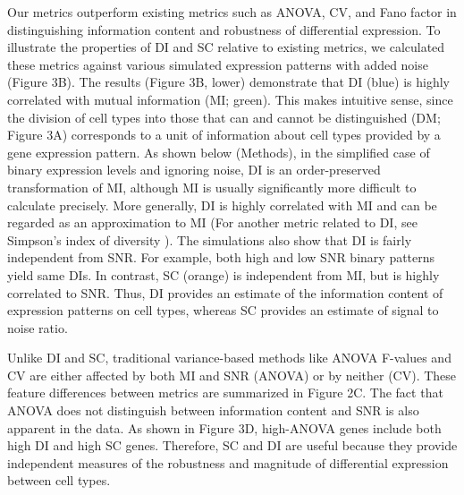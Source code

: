 Our metrics outperform existing metrics such as ANOVA, CV, and Fano factor in distinguishing information content and robustness of differential expression. To illustrate the properties of DI and SC relative to existing metrics, we calculated these metrics against various simulated expression patterns with added noise (Figure 3B). The results (Figure 3B, lower) demonstrate that DI (blue) is highly correlated with mutual information (MI; green). This makes intuitive sense, since the division of cell types into those that can and cannot be distinguished (DM; Figure 3A) corresponds to a unit of information about cell types provided by a gene expression pattern. As shown below (Methods), in the simplified case of binary expression levels and ignoring noise, DI is an order-preserved transformation of MI, although MI is usually significantly more difficult to calculate precisely. More generally, DI is highly correlated with MI and can be regarded as an approximation to MI (For another metric related to DI, see Simpson's index of diversity \cite{SIMPSON_1949}). The simulations also show that DI is fairly independent from SNR. For example, both high and low SNR binary patterns yield same DIs. In contrast, SC (orange) is independent from MI, but is highly correlated to SNR. Thus, DI provides an estimate of the information content of expression patterns on cell types, whereas SC provides an estimate of signal to noise ratio.

Unlike DI and SC, traditional variance-based methods like ANOVA F-values and CV are either affected by both MI and SNR (ANOVA) or by neither (CV). These feature differences between metrics are summarized in Figure 2C. The fact that ANOVA does not distinguish between information content and SNR is also apparent in the data. As shown in Figure 3D, high-ANOVA genes include both high DI and high SC genes. Therefore, SC and DI are useful because they provide independent measures of the robustness and magnitude of differential expression between cell types.

